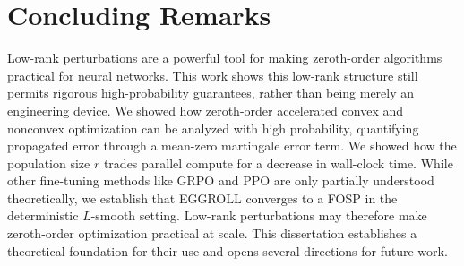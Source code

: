 \section{Concluding Remarks}
Low-rank perturbations are a powerful tool for making zeroth-order algorithms practical for neural networks. This work shows this low-rank structure still permits rigorous high-probability guarantees, rather than being merely an engineering device. We showed how zeroth-order accelerated convex and nonconvex optimization can be analyzed with high probability, quantifying propagated error through a mean-zero martingale error term. We showed how the population size $r$ trades parallel compute for a decrease in wall-clock time. While other fine-tuning methods like GRPO and PPO are only partially understood theoretically, we establish that EGGROLL converges to a FOSP in the deterministic $L$-smooth setting. Low-rank perturbations may therefore make zeroth-order optimization practical at scale. This dissertation establishes a theoretical foundation for their use and opens several directions for future work.